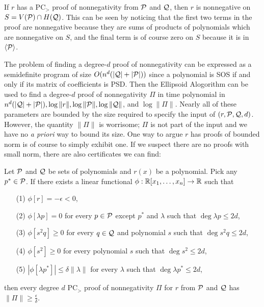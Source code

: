 If $r$ has a PC$_>$ proof of nonnegativity from $\mathcal P$ and $\mathcal Q$, then $r$ is nonnegative on $S = V(\mathcal P) \cap H(\mathcal Q)$. This can be seen by noticing that the first two terms in the proof are nonnegative because they are sums of products of polynomials which are nonnegative on $S$, and the final term is of course zero on $S$ because it is in $\langle \mathcal P \rangle$.

The problem of finding a degree-$d$ proof of nonnegativity can be expressed as a semidefinite program of size $O(n^d(|\mathcal Q| + |\mathcal P|))$ since a polynomial is SOS if and only if its matrix of coefficients is PSD. Then the Ellipsoid Alogorithm can be used to find a degree-$d$ proof of nonnegativity $\Pi$ in time polynomial in $n^{d}(|\mathcal Q| + |\mathcal P|), \log \|r\|, \log \|\mathcal P\|, \log \|\mathcal Q\|$,  and $\log \|\Pi\|$. Nearly all of these parameters are bounded by the size required to specify the input of $(r,\mathcal P,\mathcal Q,d)$. However, the quantity $\|\Pi\|$ is worrisome; $\Pi$ is not part of the input and we have no \emph{a priori} way to bound its size. One way to argue $r$ has proofs of bounded norm is of course to simply exhibit one. If we suspect there are no proofs with small norm, there are also certificates we can find:
\begin{lemma}\label{lem:prelim_dual_cert}
Let $\mathcal P$ and $\mathcal Q$ be sets of polynomials and $r(x)$ be a polynomial. Pick any $p^* \in \mathcal P$. If there exists a linear functional $\phi: \mathbb R[x_1,\dots,x_n] \rightarrow \mathbb R$ such that
\begin{enumerate}
\item[(1)] $\phi[r] = -\epsilon < 0$,
\item[(2)] $\phi[\lambda p] = 0$ for every $p \in \mathcal P$ except $p^*$ and $\lambda$ such that $\deg \lambda p \leq 2d$,
\item[(3)] $\phi[s^2q] \geq 0$ for every $q \in \mathcal Q$ and polynomial $s$ such that $\deg s^2q \leq 2d$,
\item[(4)] $\phi[s^2] \geq 0$ for every polynomial $s$ such that $\deg s^2 \leq 2d$,
\item[(5)] $|\phi[\lambda p^*]| \leq \delta \|\lambda\|$ for every $\lambda$ such that $\deg \lambda p^* \leq 2d$,
\end{enumerate}
then every degree $d$ PC$_>$ proof of nonnegativity $\Pi$ for $r$ from $\mathcal P$ and $\mathcal Q$ has $\|\Pi\| \geq \frac{\epsilon}{\delta}$.
\end{lemma}
